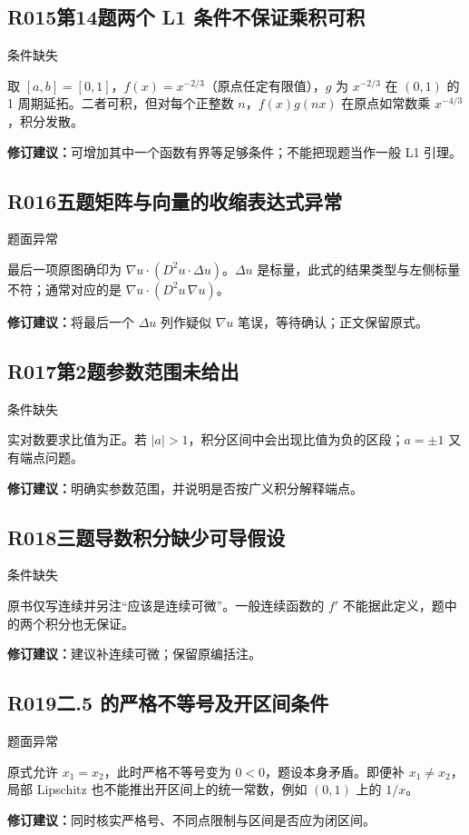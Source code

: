 \subsection*{R015\quad 第14题两个 L1 条件不保证乘积可积}
\noindent{}\quad 条件缺失\par
取 $[a,b]=[0,1]$，$f(x)=x^{-2/3}$（原点任定有限值），$g$ 为 $x^{-2/3}$ 在 $(0,1)$ 的 1 周期延拓。二者可积，但对每个正整数 $n$，$f(x)g(nx)$ 在原点如常数乘 $x^{-4/3}$，积分发散。
\par\textbf{修订建议：}可增加其中一个函数有界等足够条件；不能把现题当作一般 L1 引理。\par
{}
\subsection*{R016\quad 五题矩阵与向量的收缩表达式异常}
\noindent{}\quad 题面异常\par
最后一项原图确印为 $\nabla u\cdot(D^2u\cdot\Delta u)$。$\Delta u$ 是标量，此式的结果类型与左侧标量不符；通常对应的是 $\nabla u\cdot(D^2u\,\nabla u)$。
\par\textbf{修订建议：}将最后一个 $\Delta u$ 列作疑似 $\nabla u$ 笔误，等待确认；正文保留原式。\par
{}
\subsection*{R017\quad 第2题参数范围未给出}
\noindent{}\quad 条件缺失\par
实对数要求比值为正。若 $|a|>1$，积分区间中会出现比值为负的区段；$a=\pm1$ 又有端点问题。
\par\textbf{修订建议：}明确实参数范围，并说明是否按广义积分解释端点。\par
{}
\subsection*{R018\quad 三题导数积分缺少可导假设}
\noindent{}\quad 条件缺失\par
原书仅写连续并另注“应该是连续可微”。一般连续函数的 $f'$ 不能据此定义，题中的两个积分也无保证。
\par\textbf{修订建议：}建议补连续可微；保留原编括注。\par
{}
\subsection*{R019\quad 二.5 的严格不等号及开区间条件}
\noindent{}\quad 题面异常\par
原式允许 $x_1=x_2$，此时严格不等号变为 $0<0$，题设本身矛盾。即便补 $x_1\ne x_2$，局部 Lipschitz 也不能推出开区间上的统一常数，例如 $(0,1)$ 上的 $1/x$。
\par\textbf{修订建议：}同时核实严格号、不同点限制与区间是否应为闭区间。\par
{}
